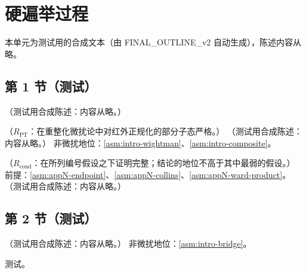 \chapter{硬遍举过程}\label{ch:excl}
本单元为测试用的合成文本（由 FINAL\_OUTLINE\_v2 自动生成），陈述内容从略。

\section{第 1 节（测试）}\label{sec:excl-da}

\begin{definition}[介子分布振幅]\label{def:excl-da}
（测试用合成陈述：内容从略。）
\end{definition}

\begin{proposition}\label{prop:excl-erbl}
（$R_{\mathrm{PT}}$：在重整化微扰论中对红外正规化的部分子态严格。）
（测试用合成陈述：内容从略。）
非微扰地位：\cref{asm:intro-wightman}、\cref{asm:intro-composite}。
\end{proposition}

\begin{proposition}\label{prop:excl-soft-cancel}
（$R_{\mathrm{cond}}$：在所列编号假设之下证明完整；结论的地位不高于其中最弱的假设。）
前提：\cref{asm:appN-endpoint}、\cref{asm:appN-collins}、\cref{asm:appN-ward-product}。
（测试用合成陈述：内容从略。）
\end{proposition}

\section{第 2 节（测试）}\label{sec:excl-soft}

\begin{theorem}\label{thm:excl-pion-ff}
（测试用合成陈述：内容从略。）
非微扰地位：\cref{asm:intro-bridge}。
\end{theorem}
\begin{proofsketch}测试。\end{proofsketch}
